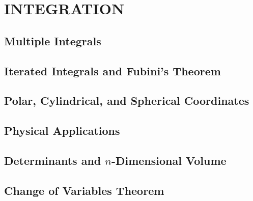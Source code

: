 \section{INTEGRATION}
\subsection{Multiple Integrals}
\subsection{Iterated Integrals and Fubini's Theorem}
\subsection{Polar, Cylindrical, and Spherical Coordinates}
\subsection{Physical Applications}
\subsection{Determinants and $n$-Dimensional Volume}
\subsection{Change of Variables Theorem}